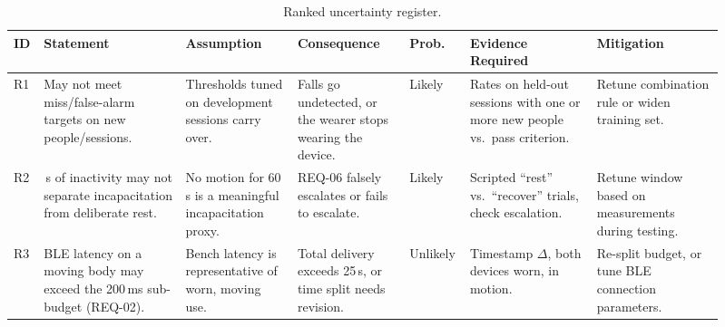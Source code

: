 
\begin{table}[!ht]
\centering
\scriptsize
\renewcommand{\arraystretch}{1.25}
\setlength{\tabcolsep}{2.5pt}
\caption{Ranked uncertainty register.}
\label{tab:uncertainties}
\begin{tabularx}{\linewidth}{@{}
  >{\raggedright\arraybackslash}p{0.02\linewidth}
  >{\raggedright\arraybackslash}p{0.19\linewidth}
  >{\raggedright\arraybackslash}p{0.15\linewidth}
  >{\raggedright\arraybackslash}p{0.15\linewidth}
  >{\raggedright\arraybackslash}p{0.05\linewidth}
  >{\raggedright\arraybackslash}p{0.175\linewidth}
  >{\raggedright\arraybackslash}p{0.175\linewidth}@{}}
\toprule
ID & Statement & Assumption & Consequence & Prob. & Evidence Required & Mitigation \\
\midrule
R1 & May not meet miss/false-alarm targets on new people/sessions. & Thresholds tuned on development sessions carry over. & Falls go undetected, or the wearer stops wearing the device. & Likely & Rates on held-out sessions with one or more new people vs.\ pass criterion. & Retune combination rule or widen training set. \\
R2 & 60\,s of inactivity may not separate incapacitation from deliberate rest. & No motion for 60\,s is a meaningful incapacitation proxy. & REQ-06 falsely escalates or fails to escalate. & Likely & Scripted ``rest'' vs.\ ``recover'' trials, check escalation. & Retune window based on measurements during testing. \\
R3 & BLE latency on a moving body may exceed the 200\,ms sub-budget (REQ-02). & Bench latency is representative of worn, moving use. & Total delivery exceeds 25\,s, or time split needs revision. & Unlikely & Timestamp $\Delta$, both devices worn, in motion. & Re-split budget, or tune BLE connection parameters. \\
\bottomrule
\end{tabularx}
\end{table}